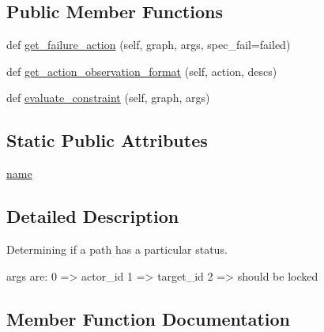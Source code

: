 \subsection*{Public Member Functions}
\begin{DoxyCompactItemize}
\item 
def \hyperlink{classlight__chats_1_1graph_1_1LockedConstraint_afd686dd0264132ac553f932d6670f8f1}{get\+\_\+failure\+\_\+action} (self, graph, args, spec\+\_\+fail=\textquotesingle{}failed\textquotesingle{})
\item 
def \hyperlink{classlight__chats_1_1graph_1_1LockedConstraint_aa0d083e42d50cfb65cde341edac6f32e}{get\+\_\+action\+\_\+observation\+\_\+format} (self, action, descs)
\item 
def \hyperlink{classlight__chats_1_1graph_1_1LockedConstraint_abfcbf9b599d27ffbe3061d5771dfdf9a}{evaluate\+\_\+constraint} (self, graph, args)
\end{DoxyCompactItemize}
\subsection*{Static Public Attributes}
\begin{DoxyCompactItemize}
\item 
\hyperlink{classlight__chats_1_1graph_1_1LockedConstraint_a3eb1d8b9659eb4aceae729d6a7e2d9f4}{name}
\end{DoxyCompactItemize}


\subsection{Detailed Description}
\begin{DoxyVerb}Determining if a path has a particular status.

args are:     0 => actor_id     1 => target_id     2 => should be locked
\end{DoxyVerb}
 

\subsection{Member Function Documentation}
\mbox{\label{classlight__chats_1_1graph_1_1LockedConstraint_abfcbf9b599d27ffbe3061d5771dfdf9a}} 
